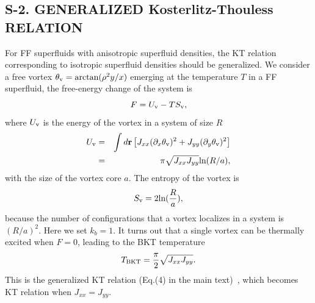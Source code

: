 \documentclass[prl,aps,twocolumn,showpacs, floatfix]{revtex4}
\begin{document}
\begin{widetext}
\section{S-2. GENERALIZED Kosterlitz-Thouless RELATION}

For FF superfluids with anisotropic superfluid densities, the KT relation~%
\cite{Bere1971S,ThoulessS} corresponding to isotropic superfluid densities
should be generalized. We consider a free vortex $\theta _{\rm v}=\text{arctan}%
(\rho ^{2}y/x)$ emerging at the temperature $T$ in a FF superfluid, the
free-energy change of the system is
\begin{equation}
F=U_{\rm v}-TS_{\rm v},
\end{equation}%
where $U_{\rm v}$ is the energy of the vortex in a system of size $R$
\begin{eqnarray}
U_{\rm v} &=&\int d\mathbf{r}\left[ J_{xx}(\partial _{x}\theta
_{\rm v})^{2}+J_{yy}(\partial _{y}\theta _{\rm v})^{2}\right]  \\
&=&\pi \sqrt{J_{xx}J_{yy}}\text{ln}(R/a),  \notag
\end{eqnarray}%
with the size of the vortex core $a$. The entropy of the vortex is
\begin{equation}
S_{\rm v}=2\text{ln}(\frac{R}{a}),
\end{equation}%
because the number of configurations that a vortex localizes in a system is $%
(R/a)^{2}$. Here we set $k_{b}=1$. It turns out that a single vortex can be
thermally excited when $F=0$, leading to the BKT temperature
\begin{equation}
T_{\rm BKT}=\frac{\pi }{2}\sqrt{J_{xx}J_{yy}}.
\end{equation}%
This is the generalized KT relation (Eq.(4) in the main text)~\cite{Melo2014arXivS}, which becomes KT
relation when $J_{xx}=J_{yy}$.


\end{widetext}
\end{document}

